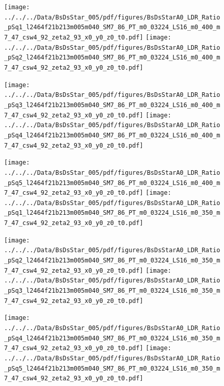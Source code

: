 \documentclass[a4paper,10pt]{article}
\begin{document}
\begin{figure}[p]
 \texttt{[image: ../../../Data/BsDsStar\_005/pdf/figures/BsDsStarA0\_LDR\_Ratio\_pSq1\_l2464f21b213m005m040\_SM7\_86\_PT\_m0\_03224\_LS16\_m0\_400\_m7\_47\_csw4\_92\_zeta2\_93\_x0\_y0\_z0\_t0.pdf]} 
 \texttt{[image: ../../../Data/BsDsStar\_005/pdf/figures/BsDsStarA0\_LDR\_Ratio\_pSq2\_l2464f21b213m005m040\_SM7\_86\_PT\_m0\_03224\_LS16\_m0\_400\_m7\_47\_csw4\_92\_zeta2\_93\_x0\_y0\_z0\_t0.pdf]} 
 \end{figure}
\begin{figure}[p]
 \texttt{[image: ../../../Data/BsDsStar\_005/pdf/figures/BsDsStarA0\_LDR\_Ratio\_pSq3\_l2464f21b213m005m040\_SM7\_86\_PT\_m0\_03224\_LS16\_m0\_400\_m7\_47\_csw4\_92\_zeta2\_93\_x0\_y0\_z0\_t0.pdf]} 
 \texttt{[image: ../../../Data/BsDsStar\_005/pdf/figures/BsDsStarA0\_LDR\_Ratio\_pSq4\_l2464f21b213m005m040\_SM7\_86\_PT\_m0\_03224\_LS16\_m0\_400\_m7\_47\_csw4\_92\_zeta2\_93\_x0\_y0\_z0\_t0.pdf]} 
 \end{figure}
\begin{figure}[p]
 \texttt{[image: ../../../Data/BsDsStar\_005/pdf/figures/BsDsStarA0\_LDR\_Ratio\_pSq5\_l2464f21b213m005m040\_SM7\_86\_PT\_m0\_03224\_LS16\_m0\_400\_m7\_47\_csw4\_92\_zeta2\_93\_x0\_y0\_z0\_t0.pdf]} 
 \texttt{[image: ../../../Data/BsDsStar\_005/pdf/figures/BsDsStarA0\_LDR\_Ratio\_pSq1\_l2464f21b213m005m040\_SM7\_86\_PT\_m0\_03224\_LS16\_m0\_350\_m7\_47\_csw4\_92\_zeta2\_93\_x0\_y0\_z0\_t0.pdf]} 
 \end{figure}
\clearpage
\begin{figure}[p]
 \texttt{[image: ../../../Data/BsDsStar\_005/pdf/figures/BsDsStarA0\_LDR\_Ratio\_pSq2\_l2464f21b213m005m040\_SM7\_86\_PT\_m0\_03224\_LS16\_m0\_350\_m7\_47\_csw4\_92\_zeta2\_93\_x0\_y0\_z0\_t0.pdf]} 
 \texttt{[image: ../../../Data/BsDsStar\_005/pdf/figures/BsDsStarA0\_LDR\_Ratio\_pSq3\_l2464f21b213m005m040\_SM7\_86\_PT\_m0\_03224\_LS16\_m0\_350\_m7\_47\_csw4\_92\_zeta2\_93\_x0\_y0\_z0\_t0.pdf]} 
 \end{figure}
\begin{figure}[p]
 \texttt{[image: ../../../Data/BsDsStar\_005/pdf/figures/BsDsStarA0\_LDR\_Ratio\_pSq4\_l2464f21b213m005m040\_SM7\_86\_PT\_m0\_03224\_LS16\_m0\_350\_m7\_47\_csw4\_92\_zeta2\_93\_x0\_y0\_z0\_t0.pdf]} 
 \texttt{[image: ../../../Data/BsDsStar\_005/pdf/figures/BsDsStarA0\_LDR\_Ratio\_pSq5\_l2464f21b213m005m040\_SM7\_86\_PT\_m0\_03224\_LS16\_m0\_350\_m7\_47\_csw4\_92\_zeta2\_93\_x0\_y0\_z0\_t0.pdf]} 
 \end{figure}
\end{document}
